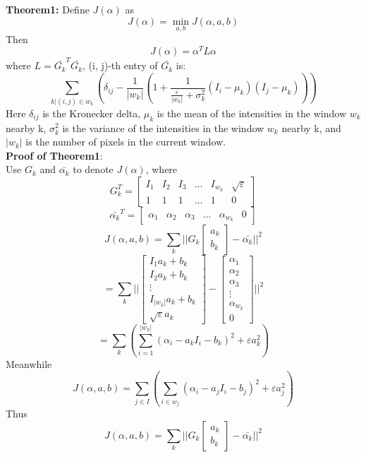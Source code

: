 \documentclass[11pt,letterpaper]{article}
\begin{document}
\textbf{Theorem1:} Define $J(\alpha)$ as 
$$J(\alpha) = \min_{a,b} J(\alpha, a, b)$$
Then
$$J(\alpha) = \alpha^T L \alpha$$
where $L = \bar{G_k}^T \bar{G_k}$, (i, j)-th entry of $\bar{G_k}$ is:
$$\sum_{k|(i, j) \in w_k}(\delta_{ij} - \frac{1}{|w_k|}(1+\frac{1}{\frac{\varepsilon}{|w_k|} + \sigma_k^2}(I_i - \mu_k)(I_j - \mu_k)))$$
Here $\delta_{ij}$ is the Kronecker delta, $\mu_k$ is the mean of the intensities in the window $w_k$  nearby k, $\sigma_k^2$ is the variance of the intensities in the window $w_k$  nearby k, and $|w_k|$ is the number of pixels in the current window. \\

\textbf{Proof of Theorem1}:\\

Use $G_k$ and $\bar{\alpha_k}$  to denote $J(\alpha)$, where
$$ G_k^T=
  \begin{bmatrix}
    I_1 & I_2 & I_3 & ... & I_{w_k} & \sqrt{\varepsilon}\\
    1 & 1 & 1 & ... & 1 & 0 
  \end{bmatrix} $$
$$ \bar{\alpha_k}^T=
  \begin{bmatrix}
    \alpha_1 & \alpha_2 & \alpha_3 & ... & \alpha_{w_k} & 0 
  \end{bmatrix} $$
$$J(\alpha, a, b) = \sum_{k}||G_k \begin{bmatrix} a_k \\ b_k\end{bmatrix} - \bar{\alpha_k}||^2$$
$$= \sum_k||\begin{bmatrix} I_{1} a_k + b_k \\ I_{2} a_k + b_k \\ \vdots \\ I_{|w_k|} a_k + b_k \\ \sqrt{\varepsilon} a_k \end{bmatrix} - 
\begin{bmatrix}
    \alpha_1 \\ \alpha_2 \\ \alpha_3 \\ \vdots\\ \alpha_{w_k} \\ 0 
\end{bmatrix}||^2$$
$$= \sum_{k}(\sum_{i = 1}^{|w_{k}|}(\alpha_i - a_kI_i-b_k)^2+\varepsilon a_k^2)$$
Meanwhile 
$$J(\alpha, a, b) = \sum_{j \in I}(\sum_{i \in w_j}(\alpha_i - a_jI_i-b_j)^2+\varepsilon a_j^2)$$
Thus
\begin{equation}
J(\alpha, a, b) = \sum_{k}||G_k \begin{bmatrix} a_k \\ b_k\end{bmatrix} - \bar{\alpha_k}||^2
\end{equation}
\end{document}

